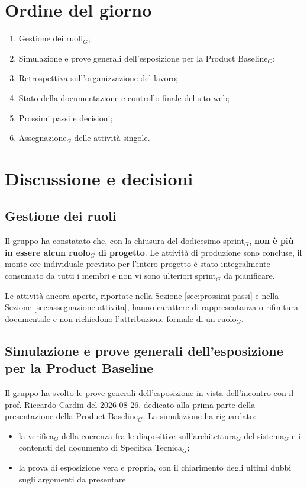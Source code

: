 \documentclass[a4paper, 10pt, colorlinks=true, linkcolor=black, urlcolor=blue, citecolor=blue, hidelinks]{article}
\begin{document}
\section{Ordine del giorno}
\begin{enumerate}
    \item Gestione dei ruoli$_G$;
    \item Simulazione e prove generali dell'esposizione per la Product Baseline$_G$;
    \item Retrospettiva sull'organizzazione del lavoro;
    \item Stato della documentazione e controllo finale del sito web;
    \item Prossimi passi e decisioni;
    \item Assegnazione$_G$ delle attività singole.
\end{enumerate}

\section{Discussione e decisioni}

\subsection{Gestione dei ruoli}
Il gruppo ha constatato che, con la chiusura del dodicesimo sprint$_G$, \textbf{non è più in essere alcun ruolo$_G$ di progetto}. Le attività di produzione sono concluse, il monte ore individuale previsto per l'intero progetto è stato integralmente consumato da tutti i membri e non vi sono ulteriori sprint$_G$ da pianificare. 

\noindent Le attività ancora aperte, riportate nella Sezione \ref{sec:prossimi-passi} e nella Sezione \ref{sec:assegnazione-attivita}, hanno carattere di rappresentanza o rifinitura documentale e non richiedono l'attribuzione formale di un ruolo$_G$.

\subsection{Simulazione e prove generali dell'esposizione per la Product Baseline}
Il gruppo ha svolto le prove generali dell'esposizione in vista dell'incontro con il prof. Riccardo Cardin del 2026-08-26, dedicato alla prima parte della presentazione della Product Baseline$_G$. La simulazione ha riguardato:

\begin{itemize}
    \item la verifica$_G$ della coerenza fra le diapositive sull'architettura$_G$ del sistema$_G$ e i contenuti del documento di Specifica Tecnica$_G$;
    \item la prova di esposizione vera e propria, con il chiarimento degli ultimi dubbi sugli argomenti da presentare.
\end{itemize}
\end{document}
